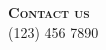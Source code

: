 \hspace{0pt}
\vfill
\noindent
{\Huge\textsc{\textbf{Contact us}}}\\[2\baselineskip]		
{\small (123) 456 7890}\\
\vfill
\hspace{0pt}